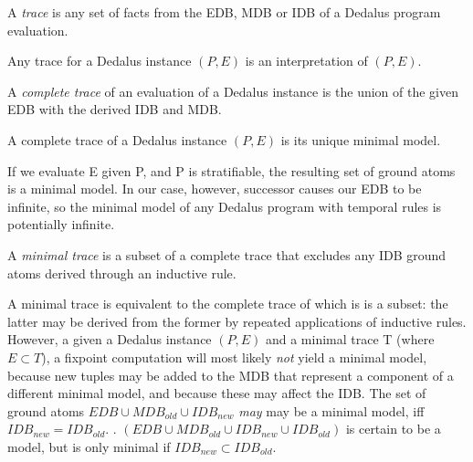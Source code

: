 

\begin{definition}
A \emph{trace} is any set of facts from the EDB, MDB or IDB of a Dedalus program evaluation.
\end{definition}

Any trace for a Dedalus instance $(P,E)$ is an interpretation of $(P,E)$.

\begin{definition}
%
A \emph{complete trace} of an evaluation of a Dedalus instance is the union of
the given EDB with the derived IDB and MDB.
%
\end{definition}

\begin{lemma}
%
A complete trace of a Dedalus instance $(P,E)$ is its unique minimal model.
%
\end{lemma}


If we evaluate E given P, and P is stratifiable, the resulting set of ground atoms is a minimal model.
In our case, however, successor causes our EDB to be infinite, so the minimal model of any Dedalus program 
with temporal rules is potentially infinite.  


\begin{definition}
A \emph{minimal trace} is a subset of a complete trace that excludes any IDB ground atoms derived through an inductive
rule.
\end{definition}

A minimal trace is equivalent to the complete trace of which is is a subset: the latter may be derived from the former by repeated
applications of inductive rules.  However, a given a Dedalus instance $(P, E)$ and a minimal trace T (where $E \subset T$), a fixpoint
computation will most likely \emph{not} yield a minimal model, because new tuples may be added to the MDB that represent a component 
of a different minimal model, and because these may affect the IDB.  The set of ground atoms $EDB \cup MDB_{old} \cup IDB_{new}$
\emph{may} may be a minimal model, iff $IDB_{new} = IDB_{old}$.  .  
$(EDB \cup MDB_{old} \cup IDB_{new} \cup IDB_{old})$ is certain to be a model, but is only minimal if $IDB_{new} \subset IDB_{old}$.

